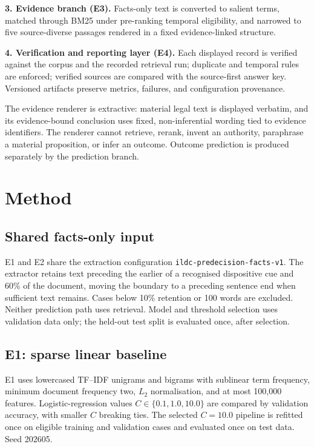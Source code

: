 \documentclass[conference]{IEEEtran}
\begin{document}
\textbf{3. Evidence branch (E3).} Facts-only text is converted to salient
terms, matched through BM25 under pre-ranking temporal eligibility, and narrowed
to five source-diverse passages rendered in a fixed
evidence-linked structure.

\textbf{4. Verification and reporting layer (E4).} Each displayed record
is verified against the corpus and the recorded retrieval run; duplicate
and temporal rules are enforced; verified sources are compared
with the source-first answer key. Versioned artifacts preserve
metrics, failures, and configuration provenance.

The evidence renderer is extractive: material legal text is displayed verbatim, and its
evidence-bound conclusion uses fixed, non-inferential wording tied to evidence
identifiers. The renderer cannot retrieve, rerank, invent an authority,
paraphrase a material proposition, or infer an outcome. Outcome prediction is produced separately by
the prediction branch.

\section{Method}

\subsection{Shared facts-only input}

E1 and E2 share the extraction configuration \texttt{ildc-\allowbreak predecision-\allowbreak facts-\allowbreak v1}.
The extractor retains text preceding the earlier of a recognised dispositive cue
and 60\% of the document, moving the boundary to a preceding sentence end when
sufficient text remains. Cases below 10\% retention or 100 words are excluded.
Neither prediction path uses retrieval. Model and threshold selection uses
validation data only; the held-out test split is evaluated once, after
selection.

\subsection{E1: sparse linear baseline}

E1 uses lowercased TF--IDF unigrams and bigrams with
sublinear term frequency, minimum document frequency two, $L_2$ normalisation,
and at most 100{,}000 features. Logistic-regression values
$C \in \{0.1, 1.0, 10.0\}$ are compared by validation accuracy, with smaller $C$
breaking ties. The selected $C = 10.0$ pipeline is refitted once on eligible
training and validation cases and evaluated once on test data. Seed 202605.
\end{document}
